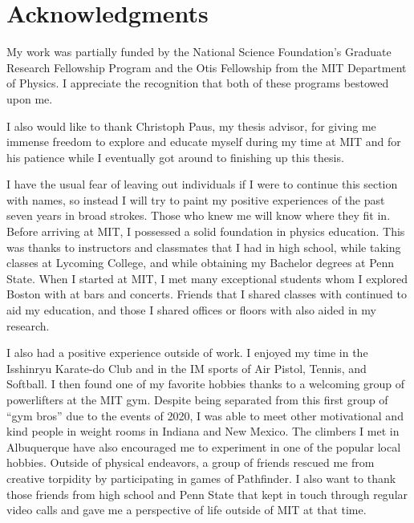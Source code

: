% 

\cleardoublepage

\section*{Acknowledgments}

My work was partially funded by the National Science Foundation's
Graduate Research Fellowship Program and
the Otis Fellowship from the MIT Department of Physics.
I appreciate the recognition that both of these programs bestowed upon me.

I also would like to thank Christoph Paus, my thesis advisor,
for giving me immense freedom to explore and educate myself during my time at MIT and
for his patience while I eventually got around to finishing up this thesis.

I have the usual fear of leaving out individuals if I were to continue this section with names,
so instead I will try to paint my positive experiences of the past seven years in broad strokes.
Those who knew me will know where they fit in.
Before arriving at MIT, I possessed a solid foundation in physics education.
This was thanks to instructors and classmates that I had in high school,
while taking classes at Lycoming College, and while obtaining my Bachelor degrees at Penn State.
When I started at MIT,
I met many exceptional students whom I explored Boston with at bars and concerts.
Friends that I shared classes with continued to aid my education,
and those I shared offices or floors with also aided in my research.

I also had a positive experience outside of work.
I enjoyed my time in the Isshinryu Karate-do Club and
in the IM sports of Air Pistol, Tennis, and Softball.
I then found one of my favorite hobbies
thanks to a welcoming group of powerlifters at the MIT gym.
Despite being separated from this first group of ``gym bros'' due to the events of 2020,
I was able to meet other motivational and kind people in weight rooms in Indiana and New Mexico.
The climbers I met in Albuquerque have also encouraged me to experiment in one of the popular local hobbies.
Outside of physical endeavors,
a group of friends rescued me from creative torpidity by participating in games of Pathfinder.
I also want to thank those friends from high school and Penn State that kept in touch
through regular video calls and gave me a perspective of life outside of MIT at that time.

